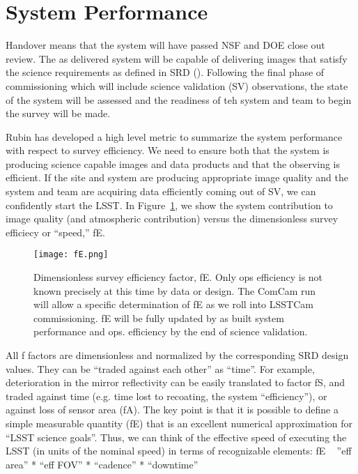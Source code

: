 \section{System Performance}

Handover means that the system will have passed NSF and DOE close out review. The as delivered system will be capable of delivering images that satisfy the science requirements as defined in SRD (\cite{LPM-17}). Following the final phase of commissioning which will include science validation (SV) observations, the state of the system will be assessed and the readiness of teh system and team to begin the survey will be made. 

Rubin has developed a high level metric to summarize the system performance with respect to survey efficiency. We need to ensure both that the system is producing science capable images and data products and that the observing is efficient. 
If the site and system are producing appropriate image quality and the system and team are acquiring data efficiently coming out of SV, we can confidently start the LSST. In Figure~\ref{fE}, we show the system contribution to image quality (and atmospheric contribution) versus the dimensionless survey efficiecy or ``speed,'' fE. 

\begin{figure}%
  \centering
\texttt{[image: fE.png]}
\caption{Dimensionless survey efficiency factor, fE. Only ops efficiency is not known precisely at this time by data or design. The ComCam run will allow a specific determination of fE as we roll into LSSTCam commissioning. fE will be fully updated by as built system performance and ops. efficiency by the end of science validation.}
\label{fE}
\end{figure}

All f factors are dimensionless and normalized by the corresponding SRD design values. They can be “traded against each other” as “time”.
For example, deterioration in the mirror reflectivity can be easily translated to factor fS, and traded against time (e.g. time lost to recoating, the system “efficiency”), or against loss of sensor area (fA).
The key point is that it is possible to define a simple measurable quantity (fE) that is an excellent numerical approximation for “LSST science goals”. Thus, we can think of the effective speed of executing the LSST (in units of the nominal speed) in terms of recognizable elements: fE ~ ”eff area” * “eff FOV” * “cadence” * “downtime”

